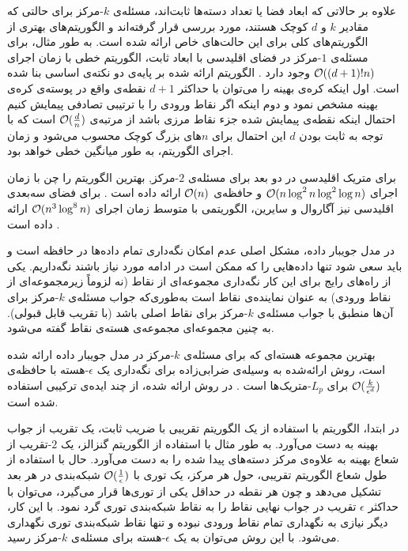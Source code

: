 علاوه بر حالاتی که ابعاد فضا یا تعداد دسته‌ها ثابت‌اند، مسئله‌ی $k$-مرکز برای حالتی که مقادیر $k$ و $d$ کوچک هستند، مورد بررسی قرار گرفته‌اند و الگوریتم‌های بهتری از الگوریتم‌های کلی برای این حالت‌های خاص ارائه شده است.
به طور مثال، برای مسئله‌ی $1$-مرکز در فضای اقلیدسی با ابعاد ثابت، الگوریتم خطی با زمان اجرای $\mathcal{O}((d+1)! n)$ وجود دارد .
الگوریتم ارائه شده بر پایه‌ی دو نکته‌ی اساسی بنا شده است.
اول اینکه کره‌ی بهینه را می‌توان با حداکثر $d+1$ نقطه‌ی واقع در پوسته‌ی کره‌ی بهینه مشخص نمود و دوم اینکه اگر نقاط ورودی را با ترتیبی تصادفی پیمایش کنیم احتمال اینکه نقطه‌ی پیمایش شده جزء نقاط مرزی باشد از مرتبه‌ی $\mathcal{O}(\frac{d}{n})$ است که با توجه به ثابت بودن $d$ این احتمال برای $n$های بزرگ کوچک محسوب می‌شود و زمان اجرای الگوریتم، به طور میانگین خطی خواهد بود. 


برای متریک اقلیدسی در دو بعد برای مسئله‌ی $2$-مرکز, بهترین الگوریتم را چن با زمان اجرای $\mathcal{O}(n \log^2{n} \log^2{\log{n}})$ و حافظه‌ی $\mathcal{O}(n)$ ارائه داده است .
برای فضای سه‌بعدی اقلیدسی نیز آگاروال و سایرین، الگوریتمی با متوسط زمان اجرای $\mathcal{O}(n^3\log^8{n})$ ارائه داده است .


در مدل جویبار داده، مشکل اصلی عدم امکان نگه‌داری تمام داده‌ها در حافظه است و باید سعی شود تنها داده‌هایی را که ممکن است در ادامه مورد نیاز باشند نگه‌داریم.
یکی از راه‌های رایج برای این کار نگه‌داری مجموعه‌ای از نقاط (نه لزوماً زیرمجموعه‌ای از نقاط ورودی) به عنوان نماینده‌ی نقاط است به‌طوری‌که جواب مسئله‌ی $k$-مرکز برای آن‌ها منطبق با جواب مسئله‌ی $k$-مرکز برای نقاط اصلی باشد (با تقریب قابل قبولی).
به چنین مجموعه‌ای مجموعه‌ی هسته‌ی نقاط گفته می‌شود. 

بهترین مجموعه هسته‌ای که برای مسئله‌ی $k$-مرکز در مدل جویبار داده ارائه شده است، روش ارائه‌شده به وسیله‌ی ضرابی‌زاده برای نگه‌داری یک $\epsilon$-هسته با حافظه‌ی $\mathcal{O}(\frac{k}{\epsilon^d})$ برای $L_p$-متریک‌ها است .
در روش ارائه شده، از چند ایده‌ی ترکیبی استفاده شده است. 

در ابتدا، الگوریتم با استفاده از یک الگوریتم تقریبی با ضریب ثابت، یک تقریب از جواب بهینه به دست می‌آورد.
به طور مثال با استفاده از الگوریتم گنزالز، یک $2$-تقریب از شعاع بهینه به علاوه‌ی مرکز دسته‌های پیدا شده را به دست می‌آورد.
حال با استفاده از طول شعاع الگوریتم تقریبی، حول هر مرکز، یک توری با $\mathcal{O}(\frac{1}{\epsilon})$ شبکه‌بندی در هر بعد تشکیل می‌دهد و چون هر نقطه در حداقل یکی از توری‌ها قرار می‌گیرد، می‌توان با حداکثر $\epsilon$ تقریب در جواب نهایی نقاط را به نقاط شبکه‌بندی توری گرد نمود.
با این کار، دیگر نیازی به نگهداری تمام نقاط ورودی نبوده و تنها نقاط شبکه‌بندی توری نگهداری می‌شود.
با این روش می‌توان به یک $\epsilon$-هسته برای مسئله‌ی $k$-مرکز رسید. 

